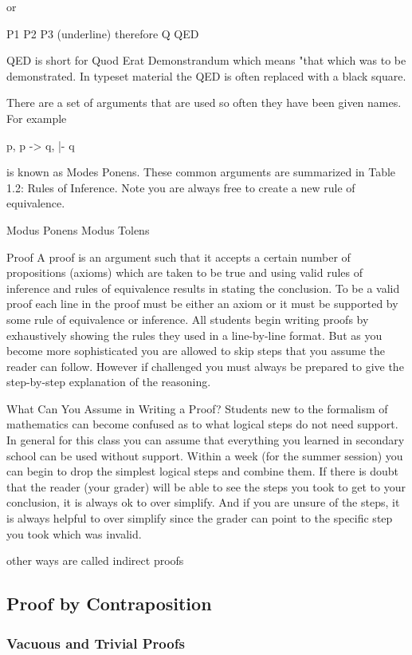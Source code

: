 \documentclass[11pt]{book} %
\theoremstyle {definition}
\theoremstyle {remark}
\begin{document}
or 

P1
P2
P3
(underline)
therefore Q
QED

QED is short for Quod Erat Demonstrandum which means "that which was to be demonstrated. In typeset material the QED is often replaced with a black square.

There are a set of arguments that are used so often they have been given names. For example 

p, p -> q, |- q 

is known as Modes Ponens. These common arguments are summarized in Table 1.2: Rules of Inference. Note you are always free to create a new rule of equivalence.

Modus Ponens
Modus Tolens

Proof
A proof is an argument such that it accepts a certain number of propositions (axioms) which are taken to be true and using valid rules of inference and rules of equivalence results in stating the conclusion. To be a valid proof each line in the proof must be either an axiom or it must be supported by some rule of equivalence or inference. All students begin writing proofs by exhaustively showing the rules they used in a line-by-line format. But as you become more sophisticated you are allowed to skip steps that you assume the reader can follow. However if challenged you must always be prepared to give the step-by-step explanation of the reasoning.


What Can You Assume in Writing a Proof?
Students new to the formalism of mathematics can become confused as to what logical steps do not need support. In general for this class you can assume that everything you learned in secondary school can be used without support. Within a week (for the summer session) you can begin to drop the simplest logical steps and combine them. If there is doubt that the reader (your grader) will be able to see the steps you took to get to your conclusion, it is always ok to over simplify. And if you are unsure of the steps, it is always helpful to over simplify since the grader can point to the specific step you took which was invalid.

other ways are called indirect proofs
    \subsection {Proof by Contraposition}
        \subsubsection {Vacuous and Trivial Proofs}
 
\end{document}
